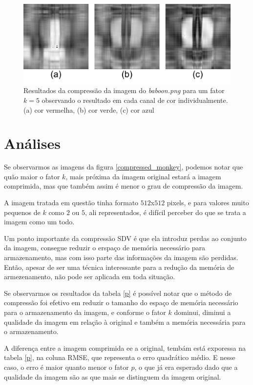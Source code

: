 \documentclass[conference]{IEEEtran}
\begin{document}
    \begin{figure}
        \includegraphics[width=\linewidth]{channel_monkey.png}
        \caption{Resultados da compressão da imagem do \textit{baboon.png} para um fator $k=5$ observando o resultado em cada canal de cor individualmente. (a) cor vermelha, (b) cor verde, (c) cor azul}
        \label{channel_monkey}
    \end{figure}


\section{Análises}

    Se observarmos as imagens da figura \ref{compressed_monkey}, podemos notar que quão maior o fator $k$, mais próxima da imagem original estará a imagem comprimida, mas que também assim é menor o grau de compressão da imagem.

    A imagem tratada em questão tinha formato $512$x$512$ pixels, e para valores muito pequenos de $k$ como $2$ ou $5$, ali representados, é difícil perceber do que se trata a imagem como um todo.

    Um ponto importante da compressão SDV é que ela introduz perdas ao conjunto da imagem, consegue reduzir o erspaço de memória necessário para armazenamento, mas com isso parte das informações da imagem são perdidas.
    Então, apesar de ser uma técnica interessante para a redução da memória de armezenamento, não pode ser aplicada em toda situação.

    Se observarmos os resultados da tabela \ref{p} é possível notar que o método de compressão foi efetivo em reduzir o tamanho do espaço de memória necessário para o armazenamento da imagem, e conforme o fator $k$ dominui, diminui a qualidade da imagem em relação à original e também a memória necessária para o armazenamento.

    A diferença entre a imagem comprimida ee a original, tembám está exporessa na tabela \ref{p}, na coluna RMSE, que representa o erro quadrático médio.
    E nesse caso, o erro é maior quanto menor o fator $p$, o que já era esperado dado que a qualidade da imagem são as que mais se distinguem da imagem original.
\end{document}
